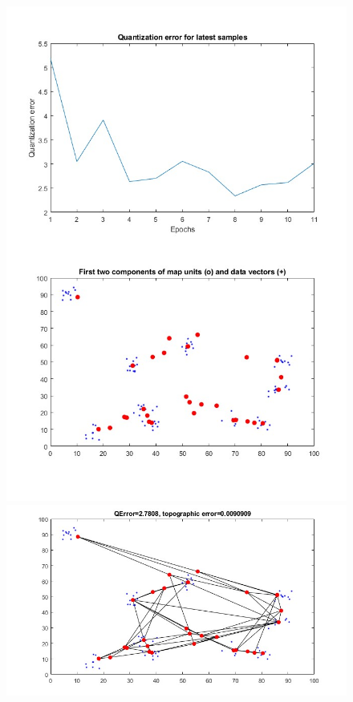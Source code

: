 \documentclass[11pt]{article}
\begin{document}
\begin{figure}[h!]
  \includegraphics{screeny/WTM_seq/WTM_seq_10_groups/WTM_seq_learning_process.jpg}
  \includegraphics{screeny/WTM_seq/WTM_seq_10_groups/WTM_seq_Graph.jpg}

\end{figure}
\end{document}
